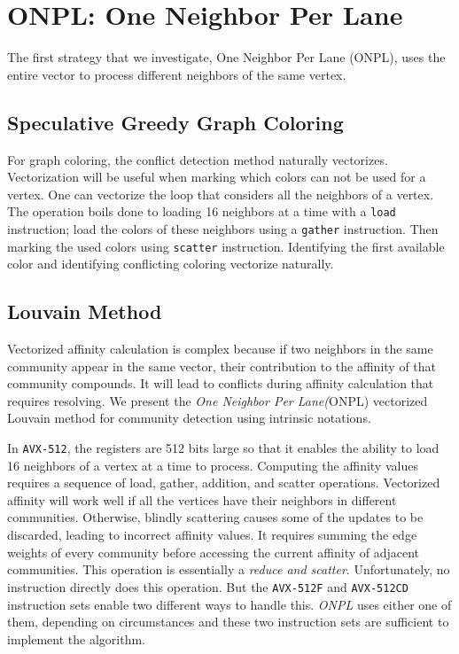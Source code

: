 \documentclass[default,iicol]{sn-jnl}%
\theoremstyle{thmstyleone}%
\theoremstyle{thmstyletwo}%
\theoremstyle{thmstylethree}%
\begin{document}
\section{ONPL: One Neighbor Per Lane}
\label{sec:onpl}
The first strategy that we investigate, One
Neighbor Per Lane (ONPL), uses the entire vector to
process different neighbors of the same vertex.
\subsection{Speculative Greedy Graph Coloring}
For graph coloring, the conflict detection method naturally
vectorizes. Vectorization will be useful when marking which colors can
not be used for a vertex.  One can vectorize the loop that considers
all the neighbors of a vertex. The operation boils done to loading 16
neighbors at a time with a \texttt{load} instruction; load the colors
of these neighbors using a \texttt{gather} instruction. Then marking
the used colors using \texttt{scatter} instruction. Identifying the
first available color and identifying conflicting coloring vectorize naturally.

\subsection{Louvain Method}
Vectorized affinity calculation is complex because if two neighbors in the same community appear in the same vector, 
their contribution to the affinity of that community compounds. It will lead to conflicts during affinity calculation that 
requires resolving. We present the \textit{One Neighbor Per Lane(}ONPL) vectorized Louvain method for community detection 
using intrinsic notations. 




In \texttt{AVX-512}, the registers are 512 bits large so that 
it enables the ability to load 16 neighbors of a vertex at a time 
to process. Computing the affinity values requires a sequence of load, gather, addition, and scatter operations. 
Vectorized affinity will work well if all the vertices have their neighbors in different communities. Otherwise, blindly 
scattering causes some of the updates to be discarded, leading to incorrect affinity values. It requires summing the edge 
weights of every community before accessing the current affinity of adjacent communities. This operation is essentially 
a \textit{reduce and scatter}. Unfortunately, no instruction directly does this operation. But the \texttt{AVX-512F} and \texttt{AVX-512CD} 
instruction sets enable two different ways to handle this. \textit{ONPL} uses either one of them, depending on circumstances 
and these two instruction sets are sufficient to implement the algorithm.
\end{document}
